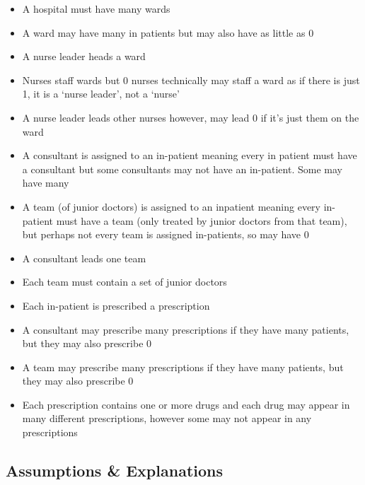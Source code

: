 \documentclass[11pt, english]{article}
\begin{document}
	\begin{itemize}
	\setlength\itemsep{0cm}
		\item A hospital must have many wards
		\item A ward may have many in patients but may also have as little as 0
		\item A nurse leader heads a ward
		\item Nurses staff wards but 0 nurses technically may staff a ward as if there is just 1, it is a `nurse leader', not a `nurse'
		\item A nurse leader leads other nurses however, may lead 0 if it's just them on the ward
		\item A consultant is assigned to an in-patient meaning every in patient must have a consultant but some consultants may not have an in-patient. Some may have many
		\item A team (of junior doctors) is assigned to an inpatient meaning every in-patient must have a team (only treated by junior doctors from that team), but perhaps not every team is assigned in-patients, so may have 0
		\item A consultant leads one team
		\item Each team must contain a set of junior doctors
		\item Each in-patient is prescribed a prescription
		\item A consultant may prescribe many prescriptions if they have many patients, but they may also prescribe 0
		\item A team may prescribe many prescriptions if they have many patients, but they may also prescribe 0
		\item Each prescription contains one or more drugs and each drug may appear in many different prescriptions, however some may not appear in any prescriptions
	\end{itemize}

\newpage

	\subsection{Assumptions \& Explanations}
\end{document}
